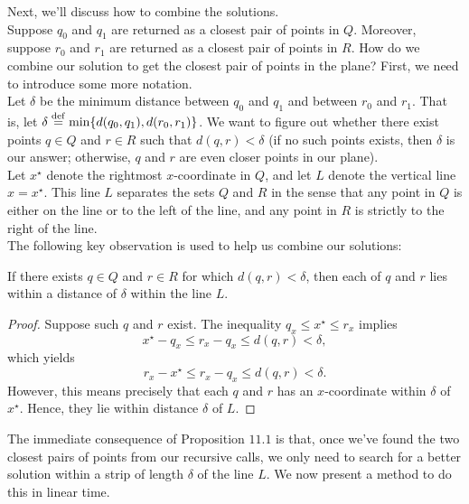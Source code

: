 Next, we'll discuss how to combine the solutions. \\

Suppose $q_0$ and $q_1$ are returned as a closest pair of points in $Q$. Moreover, suppose $r_0$ and $r_1$ are returned as a closest pair of points in $R$. How do we combine our solution to get the closest pair of points in the plane? First, we need to introduce some more notation. \\

Let $\delta$ be the minimum distance between $q_0$ and $q_1$ and between $r_0$ and $r_1$. That is, let $\delta \overset{\mathrm{def}}{=} \min\{d(q_0, q_1), d(r_0, r_1)\}$. We want to figure out whether there exist points $q\in Q$ and $r\in R$ such that $d(q, r) < \delta$ (if no such points exists, then $\delta$ is our answer; otherwise, $q$ and $r$ are even closer points in our plane). \\

Let $x^{\star}$ denote the rightmost $x$-coordinate in $Q$, and let $L$ denote the vertical line $x = x^{\star}$. This line $L$ separates the sets $Q$ and $R$ in the sense that any point in $Q$ is either on the line or to the left of the line, and any point in $R$ is strictly to the right of the line. \\

The following key observation is used to help us combine our solutions:

\begin{proposition}
If there exists $q \in Q$ and $r \in R$ for which $d(q, r) < \delta$, then each of $q$ and $r$ lies within a distance of $\delta$ within the line $L$. 
\end{proposition}
\begin{proof}
Suppose such $q$ and $r$ exist. The inequality $q_x \leq x^{\star} \leq r_x$ implies
\[
x^{\star} - q_x \leq r_x - q_x \leq d(q, r) < \delta,
\]
which yields
\[
r_x - x^{\star} \leq r_x - q_x \leq d(q, r) < \delta.
\]
However, this means precisely that each $q$ and $r$ has an $x$-coordinate within $\delta$ of $x^{\star}$. Hence, they lie within distance $\delta$ of $L$.  
\end{proof}


The immediate consequence of Proposition $11.1$ is that, once we've found the two closest pairs of points from our recursive calls, we only need to search for a better solution within a strip of length $\delta$ of the line $L$. We now present a method to do this in linear time.  \\


